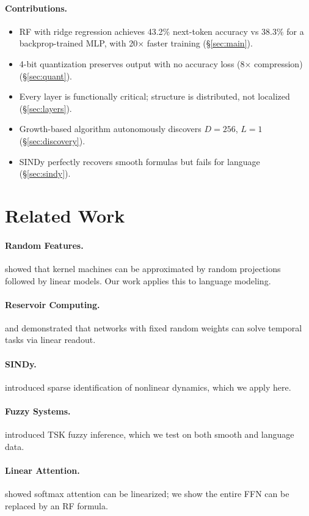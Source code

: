 \documentclass[11pt,a4paper]{article}
\begin{document}
\paragraph{Contributions.}
\begin{itemize}
  \item RF with ridge regression achieves 43.2\% next-token accuracy vs 38.3\% for a backprop-trained MLP, with 20$\times$ faster training (\S\ref{sec:main}).
  \item 4-bit quantization preserves output with no accuracy loss (8$\times$ compression) (\S\ref{sec:quant}).
  \item Every layer is functionally critical; structure is distributed, not localized (\S\ref{sec:layers}).
  \item Growth-based algorithm autonomously discovers $D=256$, $L=1$ (\S\ref{sec:discovery}).
  \item SINDy perfectly recovers smooth formulas but fails for language (\S\ref{sec:sindy}).
\end{itemize}

\section{Related Work}
\paragraph{Random Features.} \citet{rahimi2007random} showed that kernel machines can be approximated by random projections followed by linear models. Our work applies this to language modeling.
\paragraph{Reservoir Computing.} \citet{jaeger2001echo} and \citet{maass2002realtime} demonstrated that networks with fixed random weights can solve temporal tasks via linear readout.
\paragraph{SINDy.} \citet{brunton2016discovering} introduced sparse identification of nonlinear dynamics, which we apply here.
\paragraph{Fuzzy Systems.} \citet{takagi1985fuzzy} introduced TSK fuzzy inference, which we test on both smooth and language data.
\paragraph{Linear Attention.} \citet{katharopoulos2020transformers} showed softmax attention can be linearized; we show the entire FFN can be replaced by an RF formula.
\end{document}

